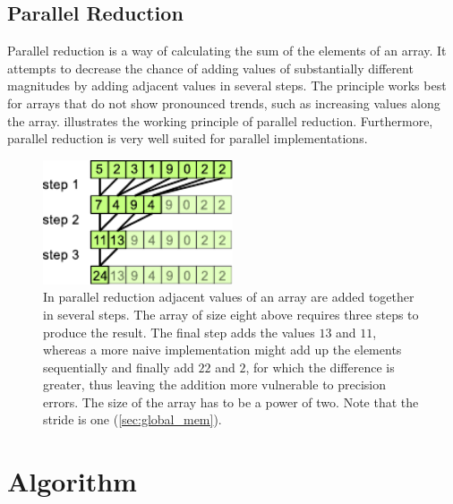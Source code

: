 \documentclass[11pt,twoside]{report}
\begin{document}
\subsection{Parallel Reduction\label{sec:parallel_reduction}}
Parallel reduction is a way of calculating the sum of the  elements of an array. It attempts to decrease the chance of adding values of substantially different magnitudes by adding adjacent values in several steps. The principle works best for arrays that do not show pronounced trends, such as increasing values along the array.  illustrates the working principle of parallel reduction. Furthermore, parallel reduction is very well suited for parallel implementations. 

\begin{figure}[htbp]
	\begin{center}
		\includegraphics[width=0.5\textwidth]{img/par_red.pdf}		
	\end{center}
	\caption{In parallel reduction adjacent values of an array are added together in several steps. The array of size eight above requires three steps to produce the result. The final step adds the values $13$ and $11$, whereas a more naive implementation might add up the elements sequentially and finally add $22$ and $2$, for which the difference is greater, thus leaving the addition more vulnerable to precision errors. The size of the array has to be a power of two. Note that the stride is one (\cref{sec:global_mem}). \label{fig:par_red}}
\end{figure}




\section{Algorithm\label{sec:algo}}
\end{document}
